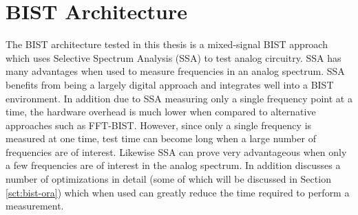 \documentclass[12pt]{report}
\begin{document}
\section{BIST Architecture}
The BIST architecture tested in this thesis is a mixed-signal BIST approach which uses Selective Spectrum Analysis (SSA) to test analog circuitry.  SSA has many advantages when used to measure frequencies in an analog spectrum.  SSA benefits from being a largely digital approach and integrates well into a BIST environment\cite{jie-journal}.  In addition due to SSA measuring only a single frequency point at a time, the hardware overhead is much lower when compared to alternative approaches such as FFT-BIST\cite{stroud-phase}. However, since only a single frequency is measured at one time, test time can become long when a large number of frequencies are of interest.  Likewise SSA can prove very advantageous when only a few frequencies are of interest in the analog spectrum\cite{jie-journal}.  In addition \cite{jie} discusses a number of optimizations in detail (some of which will be discussed in Section \ref{sct:bist-ora}) which when used can greatly reduce the time required to perform a measurement.
\end{document}
